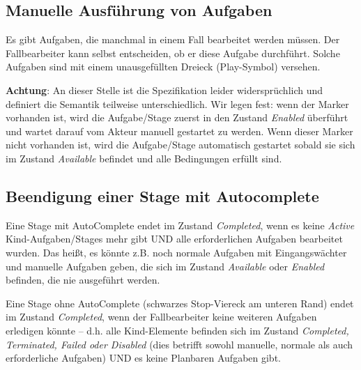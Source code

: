 \documentclass[12pt,report]{snetTeaching}
\begin{document}
\begin{RahmenNoFloat}
	\hfill
\end{RahmenNoFloat}




\subsection{Manuelle Ausführung von Aufgaben}

Es gibt Aufgaben, die manchmal in einem Fall bearbeitet werden müssen. Der Fallbearbeiter kann selbst entscheiden, ob er diese Aufgabe durchführt. Solche Aufgaben sind mit einem unausgefüllten Dreieck (Play-Symbol) versehen. 

\textbf{Achtung}: An dieser Stelle ist die Spezifikation leider widersprüchlich und definiert die Semantik teilweise unterschiedlich. Wir legen fest: wenn der Marker vorhanden ist, wird die Aufgabe/Stage zuerst in den Zustand \emph{Enabled} überführt und wartet darauf vom Akteur manuell gestartet zu werden. Wenn dieser Marker nicht vorhanden ist, wird die Aufgabe/Stage automatisch gestartet sobald sie sich im Zustand \emph{Available} befindet und alle Bedingungen erfüllt sind.



\subsection{Beendigung einer Stage mit Autocomplete}

Eine Stage mit AutoComplete endet im Zustand \emph{Completed}, wenn es keine \emph{Active} Kind-Aufgaben/Stages mehr gibt UND alle erforderlichen Aufgaben bearbeitet wurden. Das heißt, es könnte z.B. noch normale Aufgaben mit Eingangswächter und manuelle Aufgaben geben, die sich im Zustand \emph{Available} oder \emph{Enabled} befinden, die nie ausgeführt werden.

Eine Stage ohne AutoComplete (schwarzes Stop-Viereck am unteren Rand) endet im Zustand \emph{Completed}, wenn der Fallbearbeiter keine weiteren Aufgaben erledigen könnte -- d.h. alle Kind-Elemente befinden sich im Zustand \emph{Completed, Terminated, Failed oder Disabled} (dies betrifft sowohl manuelle, normale als auch erforderliche Aufgaben) UND es keine Planbaren Aufgaben gibt.
\end{document}

